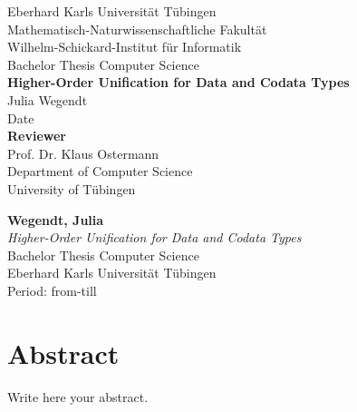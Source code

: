 \documentclass[twoside,12pt,a4paper]{article}
\begin{document}
\begin{titlepage}
 \begin{center}
  {\LARGE Eberhard Karls Universität Tübingen}\\
  {\large Mathematisch-Naturwissenschaftliche Fakultät \\
Wilhelm-Schickard-Institut für Informatik\\[4cm]}
  {\huge Bachelor Thesis Computer Science\\[2cm]}
  {\Large\bf  Higher-Order Unification for Data and Codata Types\\[1.5cm]}
 {\large Julia Wegendt}\\[0.5cm]
Date\\[3cm]
{\small\bf Reviewer}\\[0.5cm]
 {\large Prof. Dr. Klaus Ostermann}\\
  {\footnotesize Department of Computer Science\\
	University of Tübingen}
\end{center}
	
\end{titlepage}

\thispagestyle{empty}
\vspace*{\fill}
\begin{minipage}{11.2cm}
\textbf{Wegendt, Julia}\\
\emph{Higher-Order Unification for Data and Codata Types}\\ Bachelor Thesis Computer Science\\
Eberhard Karls Universität Tübingen\\
Period: from-till
\end{minipage}
\newpage


\setcounter{page}{1}


\section*{Abstract}

Write here your abstract.
\newpage
\end{document}
